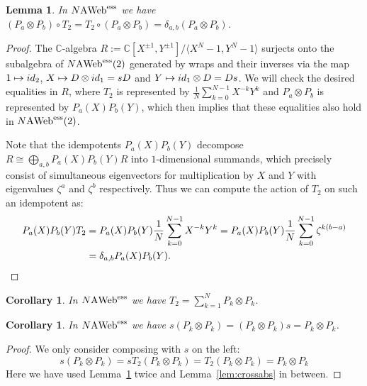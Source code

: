 \documentclass[11pt]{article}
\newtheorem{lemma}[theo]{Lemma}
\newtheorem{coro}[theo]{Corollary}
\theoremstyle{definition}
\numberwithin{equation}{section}
\def\C{{\mathbb C}}
\newcommand{\id}{{\rm id}}
\newcommand{\cat}[1]{\ensuremath{\mbox{\bfseries {\upshape {#1}}}}}
\newcommand{\wrap}{D}
\newcommand{\AWeb}[1][]{#1\cat{A}\cat{Web}}
\newcommand{\essAWeb}[1][]{#1\AWeb^{\mathrm{ess}}}
\def\la{\langle}
\def\ra{\rangle}
\begin{document}
\begin{lemma}\label{lem:extrabs} In $\essAWeb[N]$ we have $(P_a\otimes P_b)\circ T_2 = T_2\circ (P_a\otimes P_b) = \delta_{a,b}(P_a\otimes P_b)$.
\end{lemma}
\begin{proof} The $\C$-algebra $R:=\C[X^{\pm 1},Y^{\pm 1}]/\la X^N-1,Y^N-1\ra$ surjects onto the subalgebra of $\essAWeb[N](2)$ generated by wraps and their inverses via the map $1 \mapsto \id_2$, $X\mapsto \wrap\otimes \id_1=sD$ and $Y\mapsto \id_1\otimes \wrap=Ds$. We will check the desired equalities in $R$, where $T_2$ is represented by $\frac{1}{N}\sum_{k=0}^{N-1} X^{-k}Y^k$ and $P_a\otimes P_b$ is represented by $P_a(X)P_b(Y)$, which then implies that these equalities also hold in $\essAWeb[N](2)$.

Note that the idempotents $P_a(X)P_b(Y)$ decompose $R\cong \bigoplus_{a,b} P_a(X)P_b(Y) R$ into $1$-dimensional summands, which precisely consist of simultaneous eigenvectors for multiplication by $X$ and $Y$ with eigenvalues $\zeta^a$ and $\zeta^b$ respectively. Thus we can compute the action of $T_2$ on such an idempotent as:
\begin{align*}
  P_a(X)P_b(Y)T_2 &= P_a(X)P_b(Y) \frac{1}{N}\sum_{k=0}^{N-1} X^{-k}Y^k = P_a(X)P_b(Y) \frac{1}{N}\sum_{k=0}^{N-1} \zeta^{k(b-a)}\\
  &= \delta_{a,b}P_a(X)P_b(Y). \qedhere
\end{align*}

\end{proof}
\begin{coro}\label{cor:Ttwo} In $\essAWeb[N]$ we have 
 $T_2=\sum_{k=1}^N P_k\otimes P_k$.
\end{coro}


\begin{coro}\label{cor:crossabs} In $\essAWeb[N]$ we have $s(P_k\otimes P_k)=(P_k\otimes P_k)s=P_k\otimes P_k $.
\end{coro}
\begin{proof} We only consider composing with $s$ on the left:
\[s(P_k\otimes P_k)=s T_2(P_k\otimes P_k)=T_2(P_k\otimes P_k)=P_k\otimes P_k\]
Here we have used Lemma~\ref{lem:extrabs} twice and Lemma~\ref{lem:crossabs} in between.
\end{proof}
\end{document}
